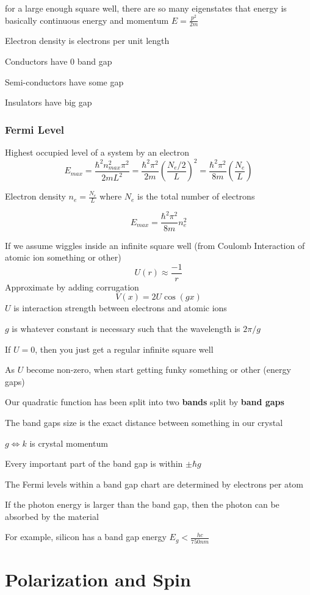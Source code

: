 \documentclass[fleqn]{report}
\begin{document}
for a large enough square well, there are so many eigenstates that energy is basically continuous energy and momentum 
$ E = \frac{p^2}{2m}$

Electron density is electrons per unit length

Conductors have 0 band gap

Semi-conductors have some gap

Insulators have big gap

\subsection{Fermi Level}
Highest occupied level of a system by an electron
\[
E_{max} = \frac{\hbar^2 n^2_{max} \pi^2}{2 m L^2} 
= 
\frac{ \hbar^2 \pi^2}{2 m} \left( \frac{ N_e/2}{L} \right)^2
=
\frac{\hbar^2 \pi^2}{8m} \left( \frac{N_e}{L} \right)
\]

Electron density $n_e = \frac{N_e}{L}$ where $N_e$ is the total number of electrons

\[
E_{max} = \frac{\hbar^2 \pi^2}{8 m} n_e^2
\]

If we assume wiggles inside an infinite square well (from Coulomb Interaction of atomic ion something or other)
\[
U(r) \approx \frac{-1}{r}
\]
Approximate by adding corrugation
\[
V(x) = 2U \cos (gx)
\]
$U$ is interaction strength between electrons and atomic ions

$g$ is whatever constant is necessary such that the wavelength is $2 \pi / g$


If $U = 0$, then you just get a regular infinite square well

As $U$ become non-zero, when start getting funky something or other (energy gaps)

Our quadratic function has been split into two \textbf{bands} split by \textbf{band gaps}

The band gaps size is the exact distance between something in our crystal

$g \iff k$ is crystal momentum

Every important part of the band gap is within $\pm \hbar g$

The Fermi levels within a band gap chart are determined by electrons per atom

If the photon energy is larger than the band gap, then the photon can be absorbed by the material

For example, silicon has a band gap energy $E_g < \frac{hc}{750 nm}$


\chapter{Polarization and Spin}
\end{document}
